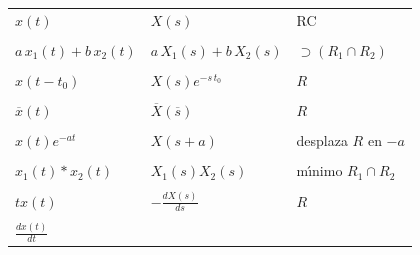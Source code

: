 \begin{center}
\begin{tabular}{lll}
$x\left( t\right)$       & $X\left( s\right) $                           & RC                            \\
                         &                                               &                               \\
 $a \, x_{1}\left( t\right) +b \, x_{2}\left( t\right) $ & 
     $a \, X_{1}\left(s\right) +b \, X_{2}\left( s\right)$ & 
        $\supset ( R_{1}\cap R_{2})$  \\ 
                         &                                               &                               \\
 $x\left( t-t_{0}\right) $                           & 
     $X\left( s\right) e^{-s \, t_{0}}$                    & 
        $R$                           \\ 
                         &                                               &                               \\
 $\overline{x}(t)$       & 
     $\overline{X}(\overline{s})$                  & 
        $R$                                                                                              \\
                         &                                               &                               \\
 $x\left( t\right) e^{-at}$ & 
     $X\left(s+a\right) $        & 
        desplaza $R$ en $-a$                                                                             \\
                         &                                               &                               \\
 $x_{1}(t) * x_{2}(t)$   & 
     $X_{1}(s) X_{2}(s)$   & 
        m\'{\i}nimo $R_{1} \cap R_{2}$                                                                   \\
                         &                                               &                               \\
 $tx\left( t\right) $    & 
     $-\frac{dX\left(s\right) }{ds}$  & 
        $R$                                                                                              \\
                         &                                               &                               \\
 $\frac{dx\left( t\right) }{dt}$  & 

\end{tabular}
\end{center}

